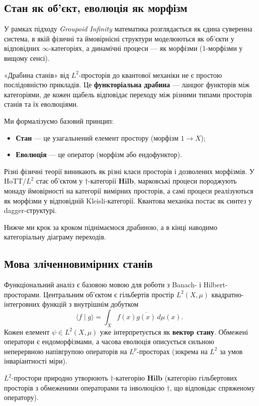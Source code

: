 \documentclass[a4paper,12pt]{article}
\begin{document}
\subsection*{Стан як об’єкт, еволюція як морфізм}

У рамках підходу \emph{Groupoid Infinity} математика розглядається як єдина суверенна система, в якій фізичні та ймовірнісні структури моделюються як об’єкти у відповідних $\infty$-категоріях, а динамічні процеси — як морфізми (1-морфізми у вищому сенсі).

«Драбина станів» від $L^2$-просторів до квантової механіки не є простою послідовністю прикладів. Це \textbf{функторіальна драбина} — ланцюг функторів між категоріями, де кожен щабель відповідає переходу між різними типами просторів станів та їх еволюціями.

Ми формалізуємо базовий принцип:
\begin{itemize}
    \item \textbf{Стан} — це узагальнений елемент простору (морфізм $1 \to X$);
    \item \textbf{Еволюція} — це оператор (морфізм або ендофунктор).
\end{itemize}

Різні фізичні теорії виникають як різні класи просторів і дозволених морфізмів. У HoTT/$L^2$ стає об’єктом у $\dagger$-категорії $\mathbf{Hilb}$, марковські процеси породжують монаду ймовірності на категорії вимірних просторів, а самі процеси реалізуються як морфізми у відповідній Kleisli-категорії. Квантова механіка постає як синтез у dagger-структурі.

Нижче ми крок за кроком піднімаємося драбиною, а в кінці наводимо категоріальну діаграму переходів.

\subsection{Мова зліченновимірних станів}

Функціональний аналіз є базовою мовою для роботи з Banach- і Hilbert-просторами. Центральним об’єктом є гільбертів простір $L^2(X,\mu)$ квадратно-інтегровних функцій з внутрішнім добутком
\[
\langle f \mid g \rangle = \int_X f(x) \overline{g(x)}\,d\mu(x).
\]
Кожен елемент $\psi \in L^2(X,\mu)$ уже інтерпретується як \textbf{вектор стану}. Обмежені оператори є ендоморфізмами, а часова еволюція описується сильною неперервною напівгрупою операторів на $L^p$-просторах (зокрема на $L^2$ за умов інваріантності міри).

$L^2$-простори природно утворюють $\dagger$-категорію $\mathbf{Hilb}$ (категорію гільбертових просторів з обмеженими операторами та інволюцією $\dagger$, що відповідає спряженому оператору).
\end{document}
